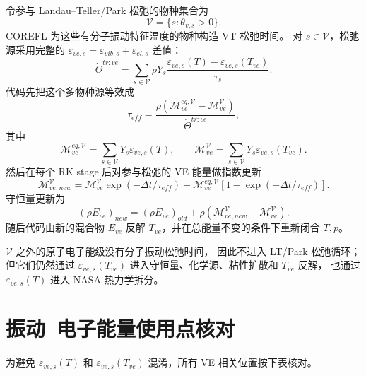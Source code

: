 \documentclass[11pt,a4paper,fontset=fandol]{ctexart}
\newcommand{\ve}{ve}
\newcommand{\tr}{tr}
\newcommand{\Mve}{\mathcal{M}_{\ve}}
\begin{document}
令参与 Landau--Teller/Park 松弛的物种集合为
\[
\mathcal{V}=\{s:\theta_{v,s}>0\}.
\]
COREFL 为这些有分子振动特征温度的物种构造 VT 松弛时间。
对 \(s\in\mathcal{V}\)，松弛源采用完整的
\(\varepsilon_{\ve,s}=\varepsilon_{vib,s}+\varepsilon_{el,s}\) 差值：
\[
\dot\Theta^{\tr:\ve}
=\sum_{s\in\mathcal{V}}\rho Y_s
\frac{\varepsilon_{\ve,s}(T)-\varepsilon_{\ve,s}(T_{\ve})}{\tau_s}.
\]
代码先把这个多物种源等效成
\[
\tau_{eff}
=\frac{\rho\left(\Mve^{eq,\mathcal{V}}-\Mve^{\mathcal{V}}\right)}
{\dot\Theta^{\tr:\ve}},
\]
其中
\[
\Mve^{eq,\mathcal{V}}=\sum_{s\in\mathcal{V}}Y_s\varepsilon_{\ve,s}(T),
\qquad
\Mve^{\mathcal{V}}=\sum_{s\in\mathcal{V}}Y_s\varepsilon_{\ve,s}(T_{\ve}).
\]
然后在每个 RK stage 后对参与松弛的 VE 能量做指数更新
\[
\mathcal{M}_{\ve,new}^{\mathcal{V}}
=\Mve^{\mathcal{V}}\exp(-\Delta t/\tau_{eff})
+\Mve^{eq,\mathcal{V}}\left[1-\exp(-\Delta t/\tau_{eff})\right].
\]
守恒量更新为
\[
(\rho E_{\ve})_{new}
=(\rho E_{\ve})_{old}
+\rho\left(\mathcal{M}_{\ve,new}^{\mathcal{V}}-\Mve^{\mathcal{V}}\right).
\]
随后代码由新的混合物 \(E_{\ve}\) 反解 \(T_{\ve}\)，并在总能量不变的条件下重新闭合
\(T,p\)。

\(\mathcal{V}\) 之外的原子电子能级没有分子振动松弛时间，
因此不进入 LT/Park 松弛循环；但它们仍然通过
\(\varepsilon_{\ve,s}(T_{\ve})\) 进入守恒量、化学源、粘性扩散和 \(T_{\ve}\) 反解，
也通过 \(\varepsilon_{\ve,s}(T)\) 进入 NASA 热力学拆分。

\section{振动--电子能量使用点核对}

为避免 \(\varepsilon_{\ve,s}(T)\) 和 \(\varepsilon_{\ve,s}(T_{\ve})\) 混淆，所有 VE 相关位置按下表核对。
\end{document}
